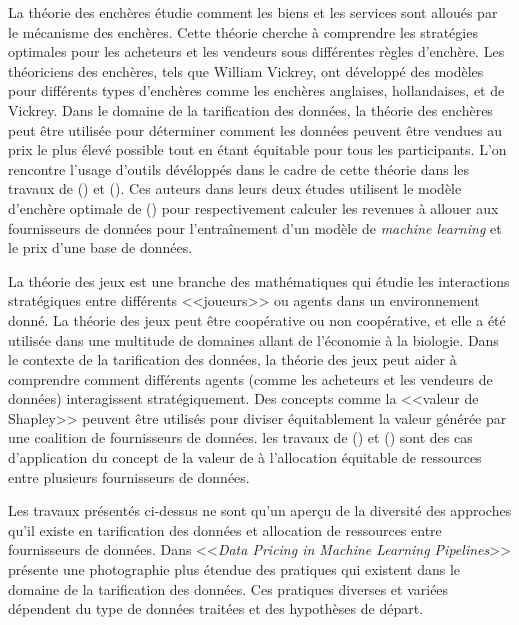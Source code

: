 La théorie des enchères étudie comment les biens et les services sont alloués par le mécanisme des enchères. Cette théorie cherche à comprendre les stratégies optimales pour les acheteurs et les vendeurs sous différentes règles d'enchère. Les théoriciens des enchères, tels que William Vickrey, ont développé des modèles pour différents types d'enchères comme les enchères anglaises, hollandaises, et de Vickrey. Dans le domaine de la tarification des données, la théorie des enchères peut être utilisée pour déterminer comment les données peuvent être vendues au prix le plus élevé possible tout en étant équitable pour tous les participants. L'on rencontre l'usage d'outils dévéloppés dans le cadre de cette théorie dans les travaux de \citeauthor{agarwal_marketplace_2019} (\citeyear{agarwal_marketplace_2019}) et \citeauthor{mehta_how_nodate} (\citeyear{mehta_how_nodate}). Ces auteurs dans leurs deux études utilisent le modèle d'enchère optimale de \citeauthor{myerson_optimal_1981} (\citeyear{myerson_optimal_1981}) pour respectivement calculer les revenues à allouer aux fournisseurs de données pour l'entraînement d'un modèle de \textit{machine learning} et le prix d'une base de données.

La théorie des jeux est une branche des mathématiques qui étudie les interactions stratégiques entre différents <<joueurs>> ou agents dans un environnement donné. La théorie des jeux peut être coopérative ou non coopérative, et elle a été utilisée dans une multitude de domaines allant de l'économie à la biologie. Dans le contexte de la tarification des données, la théorie des jeux peut aider à comprendre comment différents agents (comme les acheteurs et les vendeurs de données) interagissent stratégiquement. Des concepts comme la <<valeur de Shapley>> peuvent être utilisés pour diviser équitablement la valeur générée par une coalition de fournisseurs de données. les travaux de \citeauthor{agarwal_marketplace_2019} (\citeyear{agarwal_marketplace_2019}) et \citeauthor{khan_incentive_2023} (\citeyear{khan_incentive_2023}) sont des cas d'application du concept de la valeur de \citeauthor{l_s_shapley_value_1952} à l'allocation équitable de ressources entre plusieurs fournisseurs de données.

Les travaux présentés ci-dessus ne sont qu'un aperçu de la diversité des approches qu'il existe en tarification des données et allocation de ressources entre fournisseurs de données. Dans <<\textit{Data Pricing in Machine Learning Pipelines}>> \citeauthor{cong_data_2021} présente une photographie plus étendue des pratiques qui existent dans le domaine de la tarification des données. Ces pratiques diverses et variées dépendent du type de données traitées et des hypothèses de départ.

